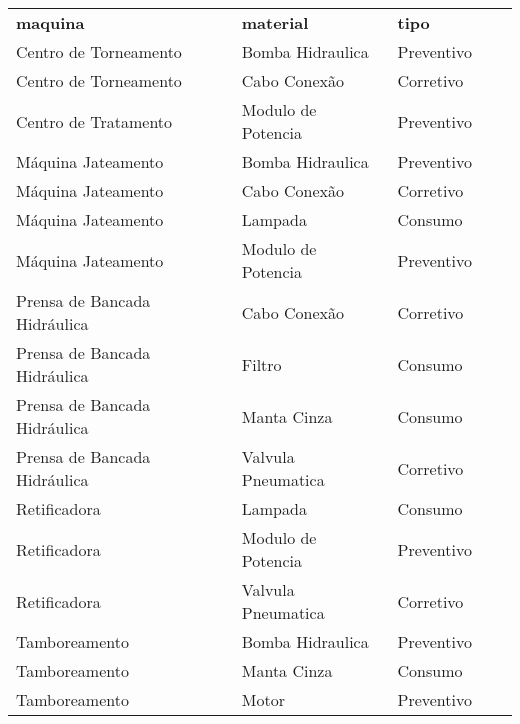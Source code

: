 \begin{tabularx}{1\textwidth} {
        | >{\raggedright\arraybackslash}X
        | >{\centering\arraybackslash}X
        | >{\centering\arraybackslash}X
        | >{\centering\arraybackslash}X
        | >{\raggedleft\arraybackslash}X |}
    \hline
    \multicolumn{3}{|c|}{Resultado}                                   \\
    \hline
    \textbf{maquina}             & \textbf{material}  & \textbf{tipo} \\
    \hline
    Centro de Torneamento        & Bomba Hidraulica   & Preventivo    \\
    \hline
    Centro de Torneamento        & Cabo Conexão       & Corretivo     \\
    \hline
    Centro de Tratamento         & Modulo de Potencia & Preventivo    \\
    \hline
    Máquina Jateamento           & Bomba Hidraulica   & Preventivo    \\
    \hline
    Máquina Jateamento           & Cabo Conexão       & Corretivo     \\
    \hline
    Máquina Jateamento           & Lampada            & Consumo       \\
    \hline
    Máquina Jateamento           & Modulo de Potencia & Preventivo    \\
    \hline
    Prensa de Bancada Hidráulica & Cabo Conexão       & Corretivo     \\
    \hline
    Prensa de Bancada Hidráulica & Filtro             & Consumo       \\
    \hline
    Prensa de Bancada Hidráulica & Manta Cinza        & Consumo       \\
    \hline
    Prensa de Bancada Hidráulica & Valvula Pneumatica & Corretivo     \\
    \hline
    Retificadora                 & Lampada            & Consumo       \\
    \hline
    Retificadora                 & Modulo de Potencia & Preventivo    \\
    \hline
    Retificadora                 & Valvula Pneumatica & Corretivo     \\
    \hline
    Tamboreamento                & Bomba Hidraulica   & Preventivo    \\
    \hline
    Tamboreamento                & Manta Cinza        & Consumo       \\
    \hline
    Tamboreamento                & Motor              & Preventivo    \\
    \hline
\end{tabularx}

